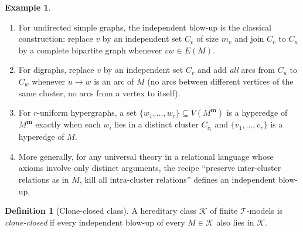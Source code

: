 \documentclass[11pt]{article}
\theoremstyle{definition}
\newtheorem{definition}[theorem]{Definition}
\newtheorem{example}[theorem]{Example}
\newcommand{\K}{\mathcal{K}}
\newcommand{\T}{\mathcal{T}}
\newcommand{\bvec}{\mathbf{m}}
\begin{document}
\begin{example}\label{ex:graphs-and-friends}\hfill
\begin{enumerate}[label=\textup{(\alph*)}, leftmargin=2.5em]
\item For undirected simple graphs, the independent blow-up is the
classical construction: replace $v$ by an independent set $C_v$ of
size $m_v$ and join $C_v$ to $C_w$ by a complete bipartite graph
whenever $vw\in E(M)$.

\item For digraphs, replace $v$ by an independent set $C_v$ and add
\emph{all} arcs from $C_u$ to $C_w$ whenever $u\to w$ is an arc of $M$
(no arcs between different vertices of the same cluster, no arcs from a
vertex to itself).

\item For $r$-uniform hypergraphs, a set
$\{w_1,\ldots,w_r\}\subseteq V(M^{\bvec})$ is a hyperedge of $M^{\bvec}$
exactly when each $w_i$ lies in a distinct cluster $C_{v_i}$ and
$\{v_1,\ldots,v_r\}$ is a hyperedge of $M$.

\item More generally, for any universal theory in a relational language
whose axioms involve only distinct arguments, the recipe ``preserve
inter-cluster relations as in $M$, kill all intra-cluster relations''
defines an independent blow-up.
\end{enumerate}
\end{example}

\begin{definition}[Clone-closed class]\label{def:clone-closed}
A hereditary class $\K$ of finite $\T$-models is \emph{clone-closed} if
every independent blow-up of every $M\in\K$ also lies in $\K$.
\end{definition}
\end{document}

